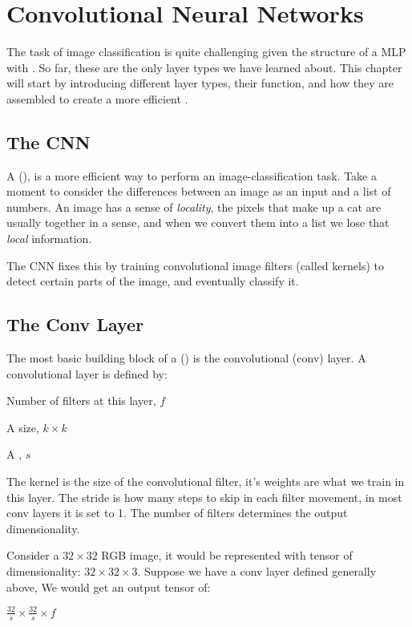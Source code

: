\chapter{Convolutional Neural Networks}

The task of image classification is quite challenging given the structure of a MLP with . So far, these are the only layer types we have learned about. This chapter will start by introducing different layer types, their function, and how they are assembled to create a more efficient .

\section{The CNN}

A  (), is a more efficient way to perform an image-classification task. Take a moment to consider the differences between an image as an input and a list of numbers. An image has a sense of \textit{locality}, the pixels that make up a cat are usually together in a sense, and when we convert them into a list we lose that \textit{local} information. 

The CNN fixes this by training convolutional image filters (called kernels) to detect certain parts of the image, and eventually classify it.

\section{The Conv Layer}

The most basic building block of a  () is the convolutional (conv) layer. A convolutional layer is defined by:
\begin{bullets}
	\item Number of filters at this layer, $f$
	\item A  size, $k \times k$
	\item A , $s$
\end{bullets}
The kernel is the size of the convolutional filter, it's weights are what we train in this layer. The stride is how many steps to skip in each filter movement, in most conv layers it is set to 1. The number of filters determines the output dimensionality.

Consider a $32\times32$ RGB image, it would be represented with tensor of dimensionality: $32\times32\times3$. Suppose we have a conv layer defined generally above, We would get an output tensor of:
\begin{bullets}
	\item $\frac{32}{s} \times \frac{32}{s} \times f$
\end{bullets}

